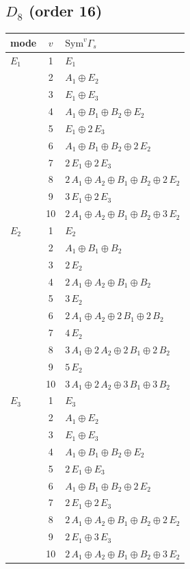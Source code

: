 \documentclass[11pt]{article}
\begin{document}
\subsection*{$D_{8}$ \quad (order 16)}
\begin{longtable}{l c p{}}
\hline mode & $v$ & $\mathrm{Sym}^v\Gamma_s$\\ \hline\endhead
$E_{1}$ & 1 & $E_{1}$\\
 & 2 & $A_{1}\oplus E_{2}$\\
 & 3 & $E_{1}\oplus E_{3}$\\
 & 4 & $A_{1}\oplus B_{1}\oplus B_{2}\oplus E_{2}$\\
 & 5 & $E_{1}\oplus 2\,E_{3}$\\
 & 6 & $A_{1}\oplus B_{1}\oplus B_{2}\oplus 2\,E_{2}$\\
 & 7 & $2\,E_{1}\oplus 2\,E_{3}$\\
 & 8 & $2\,A_{1}\oplus A_{2}\oplus B_{1}\oplus B_{2}\oplus 2\,E_{2}$\\
 & 9 & $3\,E_{1}\oplus 2\,E_{3}$\\
 & 10 & $2\,A_{1}\oplus A_{2}\oplus B_{1}\oplus B_{2}\oplus 3\,E_{2}$\\
\hline
$E_{2}$ & 1 & $E_{2}$\\
 & 2 & $A_{1}\oplus B_{1}\oplus B_{2}$\\
 & 3 & $2\,E_{2}$\\
 & 4 & $2\,A_{1}\oplus A_{2}\oplus B_{1}\oplus B_{2}$\\
 & 5 & $3\,E_{2}$\\
 & 6 & $2\,A_{1}\oplus A_{2}\oplus 2\,B_{1}\oplus 2\,B_{2}$\\
 & 7 & $4\,E_{2}$\\
 & 8 & $3\,A_{1}\oplus 2\,A_{2}\oplus 2\,B_{1}\oplus 2\,B_{2}$\\
 & 9 & $5\,E_{2}$\\
 & 10 & $3\,A_{1}\oplus 2\,A_{2}\oplus 3\,B_{1}\oplus 3\,B_{2}$\\
\hline
$E_{3}$ & 1 & $E_{3}$\\
 & 2 & $A_{1}\oplus E_{2}$\\
 & 3 & $E_{1}\oplus E_{3}$\\
 & 4 & $A_{1}\oplus B_{1}\oplus B_{2}\oplus E_{2}$\\
 & 5 & $2\,E_{1}\oplus E_{3}$\\
 & 6 & $A_{1}\oplus B_{1}\oplus B_{2}\oplus 2\,E_{2}$\\
 & 7 & $2\,E_{1}\oplus 2\,E_{3}$\\
 & 8 & $2\,A_{1}\oplus A_{2}\oplus B_{1}\oplus B_{2}\oplus 2\,E_{2}$\\
 & 9 & $2\,E_{1}\oplus 3\,E_{3}$\\
 & 10 & $2\,A_{1}\oplus A_{2}\oplus B_{1}\oplus B_{2}\oplus 3\,E_{2}$\\
\hline
\end{longtable}
\end{document}

